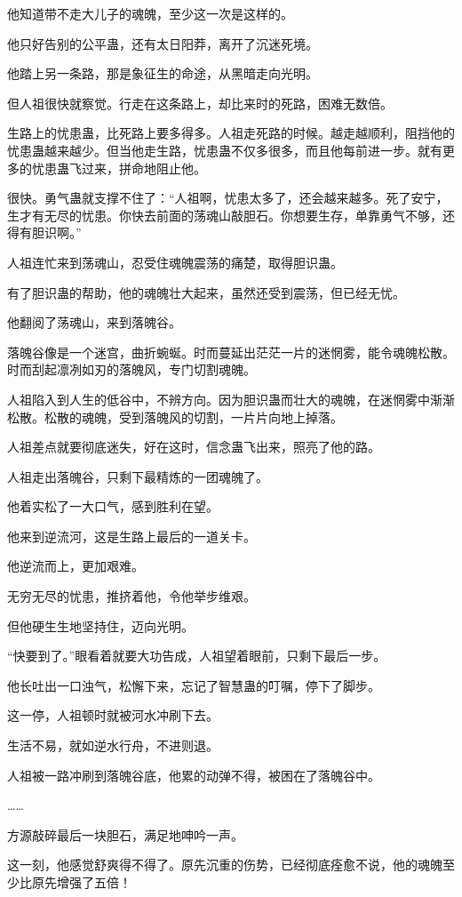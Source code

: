 \begin{this_body}
他知道带不走大儿子的魂魄，至少这一次是这样的。

他只好告别的公平蛊，还有太日阳莽，离开了沉迷死境。

他踏上另一条路，那是象征生的命途，从黑暗走向光明。

但人祖很快就察觉。行走在这条路上，却比来时的死路，困难无数倍。

生路上的忧患蛊，比死路上要多得多。人祖走死路的时候。越走越顺利，阻挡他的忧患蛊越来越少。但当他走生路，忧患蛊不仅多很多，而且他每前进一步。就有更多的忧患蛊飞过来，拼命地阻止他。

很快。勇气蛊就支撑不住了：“人祖啊，忧患太多了，还会越来越多。死了安宁，生才有无尽的忧患。你快去前面的荡魂山敲胆石。你想要生存，单靠勇气不够，还得有胆识啊。”

人祖连忙来到荡魂山，忍受住魂魄震荡的痛楚，取得胆识蛊。

有了胆识蛊的帮助，他的魂魄壮大起来，虽然还受到震荡，但已经无忧。

他翻阅了荡魂山，来到落魄谷。

落魄谷像是一个迷宫，曲折蜿蜒。时而蔓延出茫茫一片的迷惘雾，能令魂魄松散。时而刮起凛冽如刃的落魄风，专门切割魂魄。

人祖陷入到人生的低谷中，不辨方向。因为胆识蛊而壮大的魂魄，在迷惘雾中渐渐松散。松散的魂魄，受到落魄风的切割，一片片向地上掉落。

人祖差点就要彻底迷失，好在这时，信念蛊飞出来，照亮了他的路。

人祖走出落魄谷，只剩下最精炼的一团魂魄了。

他着实松了一大口气，感到胜利在望。

他来到逆流河，这是生路上最后的一道关卡。

他逆流而上，更加艰难。

无穷无尽的忧患，推挤着他，令他举步维艰。

但他硬生生地坚持住，迈向光明。

“快要到了。”眼看着就要大功告成，人祖望着眼前，只剩下最后一步。

他长吐出一口浊气，松懈下来，忘记了智慧蛊的叮嘱，停下了脚步。

这一停，人祖顿时就被河水冲刷下去。

生活不易，就如逆水行舟，不进则退。

人祖被一路冲刷到落魄谷底，他累的动弹不得，被困在了落魄谷中。

……

方源敲碎最后一块胆石，满足地呻吟一声。

这一刻，他感觉舒爽得不得了。原先沉重的伤势，已经彻底痊愈不说，他的魂魄至少比原先增强了五倍！


\end{this_body}
